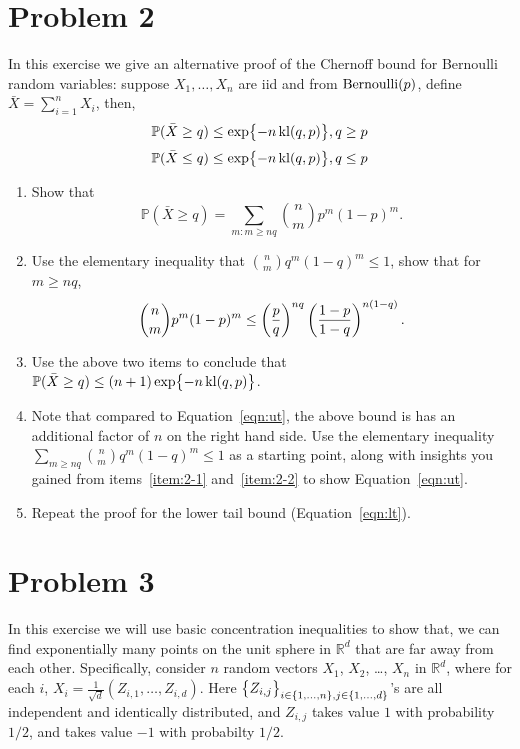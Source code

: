 \documentclass{article}
\DeclareMathOperator*{\kl}{{\rm kl}}
\DeclareMathOperator*{\Ber}{{\rm Bernoulli}}
\newcommand{\RR}{\mathbb{R}} %
\newcommand{\PP}{\mathbb{P}} %
\begin{document}
\section*{Problem 2}
In this exercise we give an alternative proof of the Chernoff bound for Bernoulli random
variables: suppose $X_1,\ldots,X_n$ are iid and from $\Ber(p)$, define
$\bar{X} = \sum_{i=1}^n X_i$, then,
\begin{equation}
  \PP( \bar{X} \geq q ) \leq \exp{-n \kl(q,p)}, q \geq p
  \label{eqn:ut}
\end{equation}
\begin{equation}
  \PP( \bar{X} \leq q ) \leq \exp{-n \kl(q,p)}, q \leq p
  \label{eqn:lt}
\end{equation}
\begin{enumerate}
\item Show that
\[ \PP( \bar{X} \geq q ) = \sum_{m: m \geq nq} {n \choose m} p^m (1-p)^m. \]
\label{item:2-1}
\item Use the elementary inequality that ${n \choose m} q^m (1-q)^m \leq 1$, show that for $m \geq nq$,
\[ {n \choose m} p^m (1-p)^m \leq \del{\frac{p}{q}}^{nq} \del{\frac{1-p}{1-q}}^{n(1-q)}. \]
\label{item:2-2}
\item Use the above two items to conclude that $\PP( \bar{X} \geq q ) \leq (n+1)\exp{-n \kl(q,p)}$.
\item Note that compared to Equation~\ref{eqn:ut}, the above bound is has an additional factor of $n$ on the right hand side.
Use the elementary inequality
 $\sum_{m \geq nq} {n \choose m} q^m (1-q)^m \leq 1$ as a starting point, along with insights you gained from
 items~\ref{item:2-1} and~\ref{item:2-2} to show Equation~\eqref{eqn:ut}.
\item Repeat the proof for the lower tail bound (Equation~\eqref{eqn:lt}).
\end{enumerate}

\section*{Problem 3}
In this exercise we will use basic concentration inequalities to show that,
we can find exponentially many points on the unit sphere in $\RR^d$ that are far away from each other.
Specifically, consider $n$ random vectors $X_1$, $X_2$, \ldots, $X_n$ in $\RR^d$,
where for each $i$, $X_i = \frac{1}{\sqrt{d}}(Z_{i,1}, \ldots, Z_{i,d})$. Here
$\cbr{Z_{i,j}}_{i \in \cbr{1,\ldots,n},j \in \cbr{1,\ldots,d}}$'s
are all independent and identically distributed, and $Z_{i,j}$ takes value $1$ with probability $1/2$, and takes value $-1$ with probabilty $1/2$.
\end{document}
